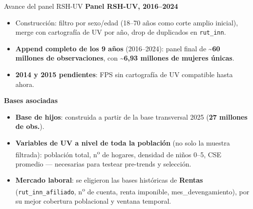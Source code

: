 \documentclass[aspectratio=169,10pt]{beamer}
\begin{document}
\begin{frame}{Avance del panel RSH-UV}
\begingroup
{}
{\small\textcolor{steel}{\textbf{Panel RSH-UV, 2016--2024}}}
\begin{itemize}
  \footnotesize
  \item Construcción: filtro por sexo/edad (18--70 años como corte amplio inicial), merge con cartografía de UV por año, drop de duplicados en \texttt{rut\_inn}.
  \item \textbf{Append completo de los 9 años} (2016--2024): panel final de \textbf{\textasciitilde60 millones de observaciones}, con \textbf{\textasciitilde6,93 millones de mujeres únicas}.
  \item \textbf{2014 y 2015 pendientes}: FPS sin cartografía de UV compatible hasta ahora.
\end{itemize}

\vspace{4pt}
{\small\textcolor{steel}{\textbf{Bases asociadas}}}
\begin{itemize}
  \footnotesize
  \item \textbf{Base de hijos}: construida a partir de la base transversal 2025 (\textbf{27 millones de obs.}).
  \item \textbf{Variables de UV a nivel de toda la población} (no solo la muestra filtrada): población total, n\textsuperscript{o} de hogares, densidad de niños 0--5, CSE promedio --- necesarias para testear pre-trends y selección.
  \item \textbf{Mercado laboral}: se eligieron las bases históricas de \textbf{Rentas} (\texttt{rut\_inn\_afiliado}, n\textsuperscript{o} de cuenta, renta imponible, mes\_devengamiento), por su mejor cobertura poblacional y ventana temporal.
\end{itemize}
\endgroup
\end{frame}
\end{document}
